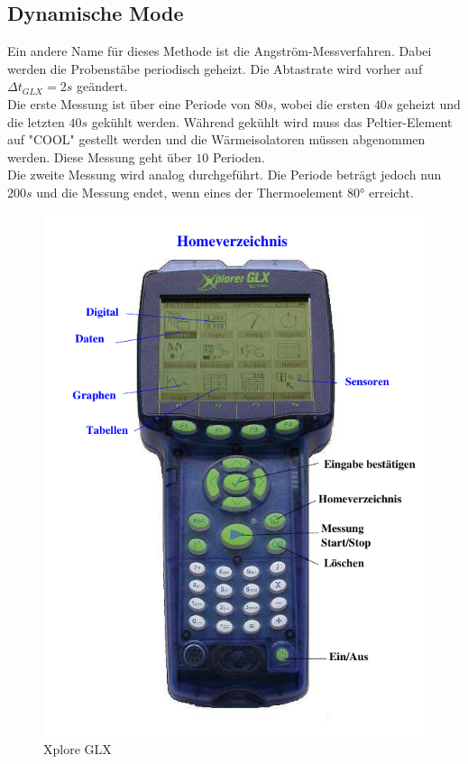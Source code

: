 \subsection{Dynamische Mode}
Ein andere Name für dieses Methode ist die Angström-Messverfahren.
Dabei werden die Probenstäbe periodisch geheizt.
Die Abtastrate wird vorher auf $\Delta t_{GLX} = 2\si{s}$ geändert.\\
Die erste Messung ist über eine Periode von $80\si{s}$, wobei die ersten $40\si{s}$ geheizt und die letzten $40\si{s}$ gekühlt werden.
Während gekühlt wird muss das Peltier-Element auf "COOL" gestellt werden und die Wärmeisolatoren müssen abgenommen werden.
Diese Messung geht über $10$ Perioden.\\
Die zweite Messung wird analog durchgeführt. 
Die Periode beträgt jedoch nun $200 \si{s}$ und die Messung endet, wenn eines der Thermoelement $80°$ erreicht.

\begin{figure}[H]
    \centering
    \includegraphics{content/Abb_2.pdf}
    \caption{Xplore GLX\cite[5]{V204}}
    \label{fig:GLX}
\end{figure}